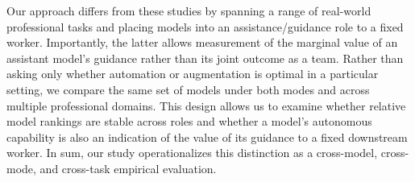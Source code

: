 Our approach differs from these studies by spanning a range of real-world professional tasks and placing models into an assistance/guidance role to a fixed worker. Importantly, the latter allows measurement of the marginal value of an assistant model's guidance rather than its joint outcome as a team. Rather than asking only whether automation or augmentation is optimal in a particular setting, we compare the same set of models under both modes and across multiple professional domains. This design allows us to examine whether relative model rankings are stable across roles and whether a model's autonomous capability is also an indication of the value of its guidance to a fixed downstream worker. In sum, our study operationalizes this distinction as a cross-model, cross-mode, and cross-task empirical evaluation.





